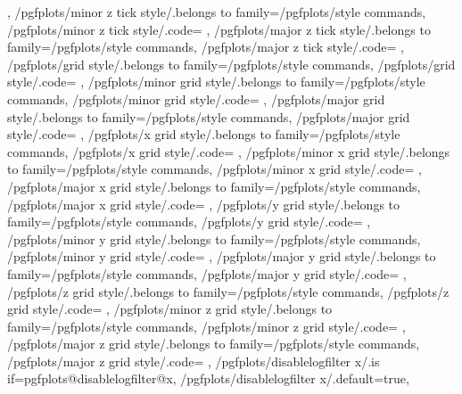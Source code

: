 {{	},
	/pgfplots/minor z tick style/.belongs to family=/pgfplots/style commands,
	/pgfplots/minor z tick style/.code={%
	},
	/pgfplots/major z tick style/.belongs to family=/pgfplots/style commands,
	/pgfplots/major z tick style/.code={%
	},
	/pgfplots/grid style/.belongs to family=/pgfplots/style commands,
	/pgfplots/grid style/.code={%
	},
	/pgfplots/minor grid style/.belongs to family=/pgfplots/style commands,
	/pgfplots/minor grid style/.code={%
	},
	/pgfplots/major grid style/.belongs to family=/pgfplots/style commands,
	/pgfplots/major grid style/.code={%
	},
	/pgfplots/x grid style/.belongs to family=/pgfplots/style commands,
	/pgfplots/x grid style/.code={%
	},
	/pgfplots/minor x grid style/.belongs to family=/pgfplots/style commands,
	/pgfplots/minor x grid style/.code={%
	},
	/pgfplots/major x grid style/.belongs to family=/pgfplots/style commands,
	/pgfplots/major x grid style/.code={%
	},
	/pgfplots/y grid style/.belongs to family=/pgfplots/style commands,
	/pgfplots/y grid style/.code={%
	},
	/pgfplots/minor y grid style/.belongs to family=/pgfplots/style commands,
	/pgfplots/minor y grid style/.code={%
	},
	/pgfplots/major y grid style/.belongs to family=/pgfplots/style commands,
	/pgfplots/major y grid style/.code={%
	},
	/pgfplots/z grid style/.belongs to family=/pgfplots/style commands,
	/pgfplots/z grid style/.code={%
	},
	/pgfplots/minor z grid style/.belongs to family=/pgfplots/style commands,
	/pgfplots/minor z grid style/.code={%
	},
	/pgfplots/major z grid style/.belongs to family=/pgfplots/style commands,
	/pgfplots/major z grid style/.code={%
	},
	/pgfplots/disablelogfilter x/.is if=pgfplots@disablelogfilter@x,
	/pgfplots/disablelogfilter x/.default=true,
}
